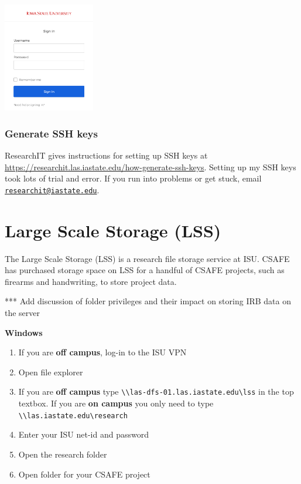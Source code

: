 \documentclass[
]{book}
\providecommand{\tightlist}{%
  \setlength{\itemsep}{0pt}\setlength{\parskip}{0pt}}
\begin{document}
\begin{enumerate}
  \includegraphics[width=0.3\textwidth,height=0.3\textheight]{images/isu_login.png}
\end{enumerate}

\hypertarget{ssh-keys}{%
\subsection{Generate SSH keys}\label{ssh-keys}}

ResearchIT gives instructions for setting up SSH keys at \url{https://researchit.las.iastate.edu/how-generate-ssh-keys}. Setting up my SSH keys took lots of trial and error. If you run into problems or get stuck, email \href{mailto:researchit@iastate.edu}{\nolinkurl{researchit@iastate.edu}}.

\hypertarget{lss}{%
\chapter{Large Scale Storage (LSS)}\label{lss}}

The Large Scale Storage (LSS) is a research file storage service at ISU. CSAFE has purchased storage space on LSS for a handful of CSAFE projects, such as firearms and handwriting, to store project data.

*** Add discussion of folder privileges and their impact on storing IRB data on the server

\textbf{Windows}

\begin{enumerate}
\def\labelenumi{\arabic{enumi}.}
\tightlist
\item
  If you are \textbf{off campus}, log-in to the ISU VPN
\item
  Open file explorer
\item
  If you are \textbf{off campus} type \texttt{\textbackslash{}\textbackslash{}las-dfs-01.las.iastate.edu\textbackslash{}lss} in the top textbox. If you are \textbf{on campus} you only need to type \texttt{\textbackslash{}\textbackslash{}las.iastate.edu\textbackslash{}research}
\item
  Enter your ISU net-id and password
\item
  Open the research folder
\item
  Open folder for your CSAFE project
\end{enumerate}
\end{document}
